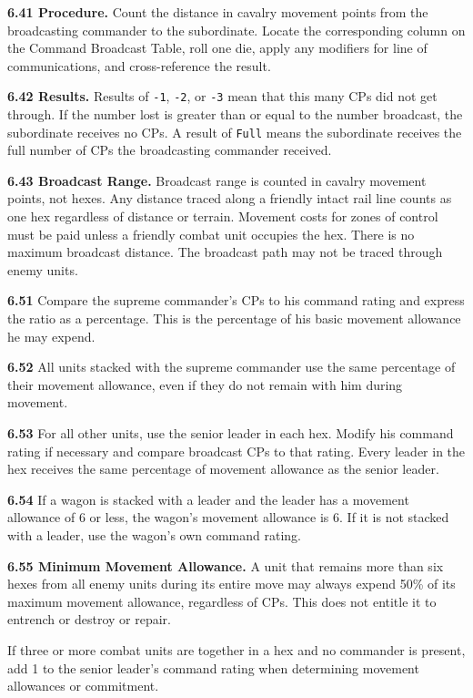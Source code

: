 \textbf{6.41 Procedure.} Count the distance in cavalry movement points from the broadcasting commander to the subordinate. Locate the corresponding column on the Command Broadcast Table, roll one die, apply any modifiers for line of communications, and cross-reference the result.

\textbf{6.42 Results.} Results of \texttt{-1}, \texttt{-2}, or \texttt{-3} mean that this many CPs did not get through. If the number lost is greater than or equal to the number broadcast, the subordinate receives no CPs. A result of \texttt{Full} means the subordinate receives the full number of CPs the broadcasting commander received.

\textbf{6.43 Broadcast Range.} Broadcast range is counted in cavalry movement points, not hexes. Any distance traced along a friendly intact rail line counts as one hex regardless of distance or terrain. Movement costs for zones of control must be paid unless a friendly combat unit occupies the hex. There is no maximum broadcast distance. The broadcast path may not be traced through enemy units.


\textbf{6.51} Compare the supreme commander's CPs to his command rating and express the ratio as a percentage. This is the percentage of his basic movement allowance he may expend.

\textbf{6.52} All units stacked with the supreme commander use the same percentage of their movement allowance, even if they do not remain with him during movement.

\textbf{6.53} For all other units, use the senior leader in each hex. Modify his command rating if necessary and compare broadcast CPs to that rating. Every leader in the hex receives the same percentage of movement allowance as the senior leader.

\textbf{6.54} If a wagon is stacked with a leader and the leader has a movement allowance of 6 or less, the wagon's movement allowance is 6. If it is not stacked with a leader, use the wagon's own command rating.

\textbf{6.55 Minimum Movement Allowance.} A unit that remains more than six hexes from all enemy units during its entire move may always expend 50\% of its maximum movement allowance, regardless of CPs. This does not entitle it to entrench or destroy or repair.


If three or more combat units are together in a hex and no commander is present, add 1 to the senior leader's command rating when determining movement allowances or commitment.

